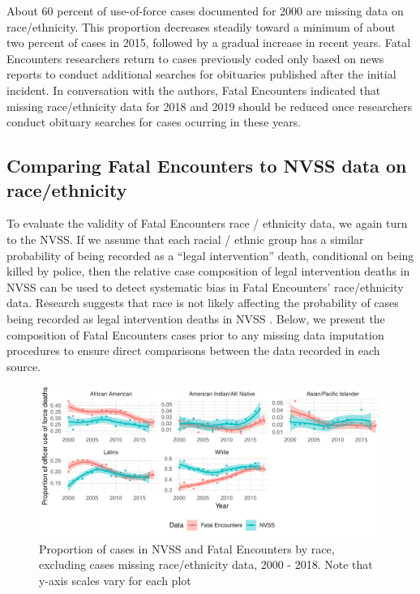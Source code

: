 \documentclass[9pt,twoside,lineno]{pnas-new}
\begin{document}
About 60 percent of use-of-force cases documented for 2000 are missing data on race/ethnicity. This proportion decreases steadily toward a minimum of about two percent of cases in 2015, followed by a gradual increase in recent years. Fatal Encounters researchers return to cases previously coded only based on news reports to conduct additional searches for obituaries published after the initial incident. In conversation with the authors, Fatal Encounters indicated that missing race/ethnicity data for 2018 and 2019 should be reduced once researchers conduct obituary searches for cases ocurring in these years.

\subsection*{Comparing Fatal Encounters to NVSS data on race/ethnicity}

To evaluate the validity of Fatal Encounters race / ethnicity data, we again turn to the NVSS. If we assume that each racial / ethnic group has a similar probability of being recorded as a ``legal intervention'' death, conditional on being killed by police, then the relative case composition of legal intervention deaths in NVSS can be used to detect systematic bias in Fatal Encounters' race/ethnicity data. Research suggests that race is not likely affecting the probability of cases being recorded as legal intervention deaths in NVSS \cite{Feldman2017Quantifying}. Below, we present the composition of Fatal Encounters cases prior to any missing data imputation procedures to ensure direct comparisons between the data recorded in each source. 

\begin{figure}
	\centering
	\includegraphics[width = \linewidth]{vis/fe_nvss_race_compare_na_rm.pdf}
	\caption{Proportion of cases in NVSS and Fatal Encounters by race, excluding cases missing race/ethnicity data, 2000 - 2018. Note that y-axis scales vary for each plot}
	\label{fig:compare_missing_na_rm}
\end{figure}
\end{document}
